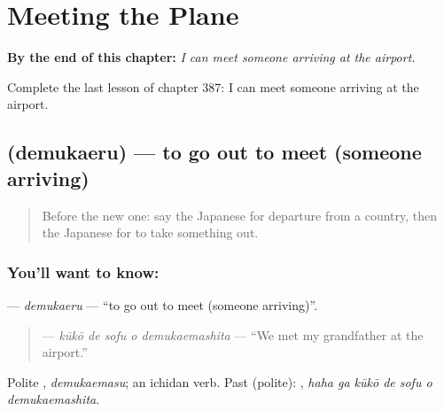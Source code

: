 
\chapter{Meeting the Plane}
\label{ch:ja-meeting-the-plane}

\begin{chapteropening}
\textbf{By the end of this chapter:} \emph{I can meet someone arriving at the airport.}

Complete the last lesson of chapter 387: I can meet someone arriving at the airport.
\end{chapteropening}

\section[\texorpdfstring{\ja{でむかえる} (demukaeru)}{でむかえる (demukaeru)}]{ (demukaeru) — to go out to meet (someone arriving)}

\label{lesson:JA-C387-demukaeru}



\begin{quote}
Before the new one: say the Japanese for departure from a country, then the Japanese for to take something out.
\end{quote}

\subsection*{You'll want to know: }
\textbf{} — \emph{demukaeru} — \textquotedblleft{}to go out to meet (someone arriving)\textquotedblright{}.

\begin{quote}
\textbf{  } — \emph{kūkō de sofu o demukaemashita} — \textquotedblleft{}We met my grandfather at the airport.\textquotedblright{}
\end{quote}

Polite \textbf{}, \emph{demukaemasu}; an ichidan verb. Past (polite): \textbf{   }, \emph{haha ga kūkō de sofu o demukaemashita}.

